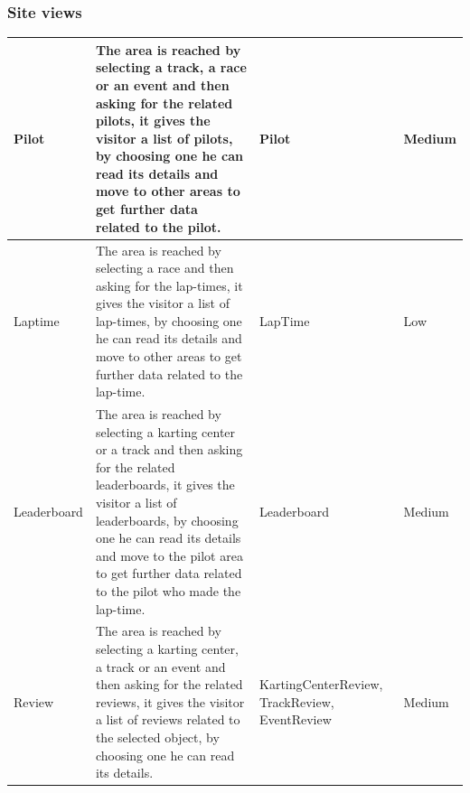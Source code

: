 \documentclass{beamer}
\begin{document}
\begin{frame}
    \frametitle{Site views}
    \begin{table}
        \centering
        \tiny
        \setlength{\tabcolsep}{1pt}
        \begin{tabular}{|m{2cm}|m{4cm}|m{3cm}|m{1cm}|}
        \hline
        Pilot & The area is reached by selecting a track, a race or an event and then asking for
        the related pilots, it gives the visitor
        a list of pilots, by choosing one he can read its details and move to other areas to get further data
        related to the pilot.
         & Pilot & Medium \\
        \hline
        Laptime & The area is reached by
        selecting a race and then asking for the lap-times, it gives the visitor a list of lap-times, by choosing one he can read its details
        and move to other areas to get further data related to the lap-time.
         & LapTime & Low \\
        \hline
        Leaderboard & The area is reached by selecting a karting center or a track and then asking for
        the related leaderboards, it gives the visitor a list of leaderboards, by choosing one he can read its details
        and move to the pilot area to get further data related to the pilot who made the lap-time.
         & Leaderboard & Medium \\
        \hline
        Review & The area is reached by selecting a karting center, a track or an event and then asking for
        the related reviews, it gives the visitor a list of reviews related to the selected object, by choosing one he can read its details.
         & KartingCenterReview, TrackReview, EventReview & Medium \\
        \hline
        \end{tabular}
    \end{table}
\end{frame}
\end{document}
